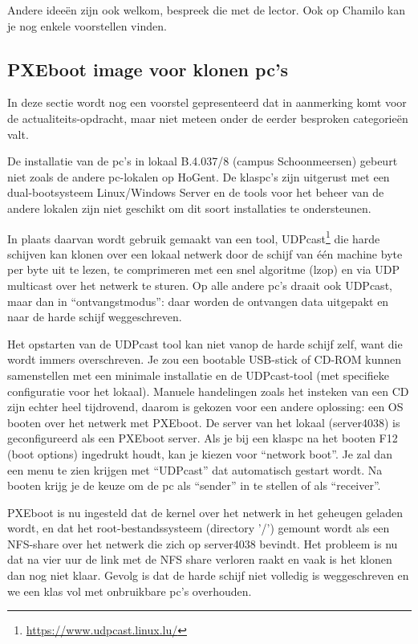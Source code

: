 Andere ideeën zijn ook welkom, bespreek die met de lector. Ook op Chamilo kan je nog enkele voorstellen vinden.

\subsection{PXEboot image voor klonen pc's}
\label{sub:pxeboot_image_voor_klonen_pc_s}

In deze sectie wordt nog een voorstel gepresenteerd dat in aanmerking komt voor de actualiteits-opdracht, maar niet meteen onder de eerder besproken categorieën valt.

De installatie van de pc's in lokaal B.4.037/8 (campus Schoonmeersen) gebeurt niet zoals de andere pc-lokalen op HoGent. De klaspc's zijn uitgerust met een dual-bootsysteem Linux/Windows Server en de tools voor het beheer van de andere lokalen zijn niet geschikt om dit soort installaties te ondersteunen.

In plaats daarvan wordt gebruik gemaakt van een tool, UDPcast\footnote{\url{https://www.udpcast.linux.lu/}} die harde schijven kan klonen over een lokaal netwerk door de schijf van één machine byte per byte uit te lezen, te comprimeren met een snel algoritme (lzop) en via UDP multicast over het netwerk te sturen. Op alle andere pc's draait ook UDPcast, maar dan in ``ontvangstmodus'': daar worden de ontvangen data uitgepakt en naar de harde schijf weggeschreven.

Het opstarten van de UDPcast tool kan niet vanop de harde schijf zelf, want die wordt immers overschreven. Je zou een bootable USB-stick of CD-ROM kunnen samenstellen met een minimale installatie en de UDPcast-tool (met specifieke configuratie voor het lokaal). Manuele handelingen zoals het insteken van een CD zijn echter heel tijdrovend, daarom is gekozen voor een andere oplossing: een OS booten over het netwerk met PXEboot. De server van het lokaal (server4038) is geconfigureerd als een PXEboot server. Als je bij een klaspc na het booten F12 (boot options) ingedrukt houdt, kan je kiezen voor ``network boot''. Je zal dan een menu te zien krijgen met ``UDPcast'' dat automatisch gestart wordt. Na booten krijg je de keuze om de pc als ``sender'' in te stellen of als ``receiver''.

PXEboot is nu ingesteld dat de kernel over het netwerk in het geheugen geladen wordt, en dat het root-bestandssysteem (directory '/') gemount wordt als een NFS-share over het netwerk die zich op server4038 bevindt. Het probleem is nu dat na vier uur de link met de NFS share verloren raakt en vaak is het klonen dan nog niet klaar. Gevolg is dat de harde schijf niet volledig is weggeschreven en we een klas vol met onbruikbare pc's overhouden.

